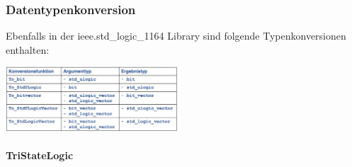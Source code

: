 \begin{multicols}{2}
	\subsubsection{Datentypenkonversion}
		Ebenfalls in der ieee.std\_logic\_1164 Library sind folgende Typenkonversionen 
		enthalten:
		\begin{center}
			\includegraphics[width=0.48\textwidth]{pics/typeconversion}
		\end{center}
	\vfill\null
	\columnbreak
	\paragraph{TriStateLogic}
	
\end{multicols}
	
